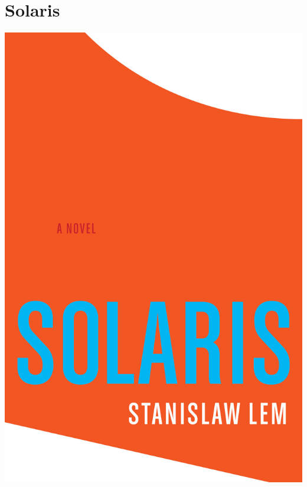 \documentclass{tufte-handout}
\makeatletter
\newcommand{\varcaption}[2][0pt]{%
  \gsetlength{\@tufte@caption@vertical@offset}{-#1}%
  \gdef\@tufte@stored@varcaption{#2}%
}
\gdef\@tufte@stored@varcaption{} %
\makeatother
\begin{document}
\section*{Solaris}
\begin{marginfigure}[1\baselineskip]
   \includegraphics[width=\linewidth]{images/solaris.jpg}
   \varcaption{\href{https://www.hmhbooks.com/shop/books/Solaris/9780156027601}{Publisher Link}, \href{https://www.amazon.com/Solaris-Stanislaw-Lem/dp/0156027607/}{Amazon Link}}
\end{marginfigure}
\end{document}

